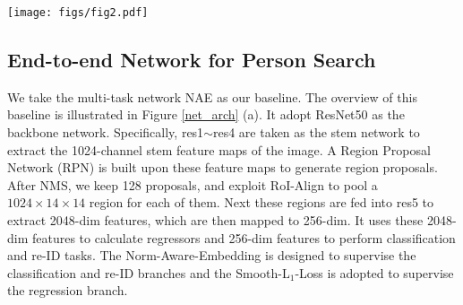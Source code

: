 \documentclass[letterpaper]{article} \usepackage{aaai21}  \usepackage{times}  \usepackage{helvet} \usepackage{courier}  \usepackage[hyphens]{url}  \usepackage{graphicx} \urlstyle{rm} \def\UrlFont{\rm}  \usepackage{natbib}  \usepackage{caption} \usepackage{multirow}
\begin{document}
\begin{figure*}[t]
    \centering
    \texttt{[image: figs/fig2.pdf]}
    \caption{(a). Baseline (b). Our Sequential End-to-end Network, in which yellow parts are modifications and NMS only be applied in inference stage. The structure before RoI-Align is the same as baseline, so it is not shown here for simplification.}
    \label{net_arch}
\end{figure*}

\subsection{End-to-end Network for Person Search}
We take the multi-task network NAE \cite{nae} as our baseline. The overview of this baseline is illustrated in Figure \ref{net_arch} (a). It adopt ResNet50 \cite{resnet} as the backbone network. Specifically, res1$\sim$res4 are taken as the stem network to extract the 1024-channel stem feature maps of the image. A Region Proposal Network (RPN) is built upon these feature maps to generate region proposals. After NMS, we keep 128 proposals, and exploit RoI-Align to pool a $1024\times14\times14$ region for each of them. Next these regions are fed into res5 to extract 2048-dim features, which are then mapped to 256-dim. It uses these 2048-dim features to calculate regressors and 256-dim features to perform classification and re-ID tasks. The Norm-Aware-Embedding is designed to supervise the classification and re-ID branches and the Smooth-L$_1$-Loss \cite{fast-rcnn} is adopted to supervise the regression branch.
\end{document}
